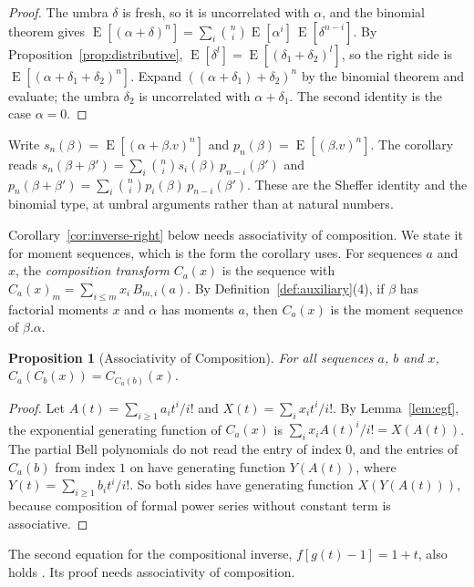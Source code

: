 \documentclass[11pt,a4paper]{report}
\theoremstyle{plain}
\newtheorem{proposition}[theorem]{Proposition}
\theoremstyle{definition}
\theoremstyle{remark}
\newcommand{\E}{\operatorname{E}}
\begin{document}
\begin{proof}
The umbra $\delta$ is fresh, so it is uncorrelated with $\alpha$, and the
binomial theorem gives
$\E[(\alpha + \delta)^n] = \sum_i \binom{n}{i} \E[\alpha^i]\, \E[\delta^{n-i}]$.
By Proposition~\ref{prop:distributive},
$\E[\delta^l] = \E[(\delta_1 + \delta_2)^l]$, so the right side is
$\E[(\alpha + \delta_1 + \delta_2)^n]$. Expand
$((\alpha + \delta_1) + \delta_2)^n$ by the binomial theorem and evaluate; the
umbra $\delta_2$ is uncorrelated with $\alpha + \delta_1$. The second identity is
the case $\alpha = 0$.
\end{proof}

Write $s_n(\beta) = \E[(\alpha + \beta.v)^n]$ and $p_n(\beta) = \E[(\beta.v)^n]$.
The corollary reads $s_n(\beta + \beta') = \sum_i \binom{n}{i} s_i(\beta)\,
p_{n-i}(\beta')$ and $p_n(\beta + \beta') = \sum_i \binom{n}{i} p_i(\beta)\,
p_{n-i}(\beta')$. These are the Sheffer identity and the binomial type, at umbral
arguments rather than at natural numbers.

Corollary~\ref{cor:inverse-right} below needs associativity of composition. We
state it for moment sequences, which is the form the corollary uses. For
sequences $a$ and $x$, the \emph{composition transform} $C_a(x)$ is the sequence
with $C_a(x)_m = \sum_{i \leq m} x_i\, B_{m,i}(a)$. By
Definition~\ref{def:auxiliary}(4), if $\beta$ has factorial moments $x$ and
$\alpha$ has moments $a$, then $C_a(x)$ is the moment sequence of $\beta.\alpha$.

\begin{proposition}[Associativity of Composition]
\label{prop:assoc}
For all sequences $a$, $b$ and $x$, $C_a(C_b(x)) = C_{C_a(b)}(x)$.
\end{proposition}

\begin{proof}
Let $A(t) = \sum_{i \geq 1} a_i t^i / i!$ and $X(t) = \sum_i x_i t^i / i!$. By
Lemma~\ref{lem:egf}, the exponential generating function of $C_a(x)$ is
$\sum_i x_i A(t)^i / i! = X(A(t))$. The partial Bell polynomials do not read the
entry of index $0$, and the entries of $C_a(b)$ from index $1$ on have generating
function $Y(A(t))$, where $Y(t) = \sum_{i \geq 1} b_i t^i / i!$. So both sides
have generating function $X(Y(A(t)))$, because composition of formal power series
without constant term is associative.
\end{proof}

The second equation for the compositional inverse, $f[g(t) - 1] = 1 + t$, also
holds \cite{DiNardoSenato2001}. Its proof needs associativity of
composition.
\end{document}
